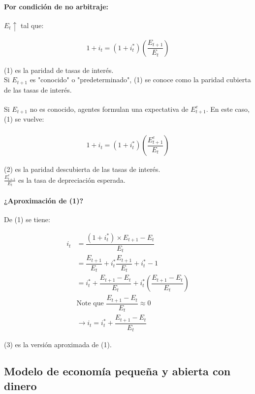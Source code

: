 \documentclass[8pt]{article}
\begin{document}
\paragraph*{Por condición de no arbitraje:} $E_{t} \uparrow$ tal que: 

\begin{align}
    \label{eq:1}
    1+i_{t} = (1+i_{t}^*)\left(\dfrac{E_{t+1}}{E_{t}}\right)
\end{align}

(1) es la paridad de tasas de interés. \\
    Si $E_{t+1}$ es "conocido" o "predeterminado", (1) se conoce como la paridad cubierta de las tasas de interés. \\\\
    Si $E_{t+1}$ no es conocido, agentes formulan una expectativa de $E_{t+1}^e$. En este caso, (1) se vuelve: \\\\
    \begin{align}
        1+i_{t} = (1+i_{t}^*)\left(\dfrac{E_{t+1}^e}{E_{t}}\right)
    \end{align}

(2) es la paridad descubierta de las tasas de interés. \\

    $\frac{E_{t+1}^e}{E_{t}}$ es la tasa de depreciación esperada.

\paragraph*{¿Aproximación de (1)?}

De (1) se tiene:

\begin{align}
    i_t &= \dfrac{(1+i_t^*) \times E_{t+1} - E_{t}}{E_{t}} \nonumber\\
        &= \dfrac{E_{t+1}}{E_t} + i_t^*\dfrac{E_{t+1}}{E_{t}} + i_t^* - 1 \nonumber\\
        &= i_t^* + \dfrac{E_{t+1}-E_t}{E_{t}} + i_t^*\left(\dfrac{E_{t+1}-E_t}{E_{t}}\right) \nonumber\\
        &\text{Note que } \dfrac{E_{t+1}-E_t}{E_{t}} \approx 0 \nonumber\\
        &\rightarrow i_t = i_t^* + \dfrac{E_{t+1}-E_t}{E_{t}}
\end{align}

(3) es la versión aproximada de (1).

\subsection{Modelo de economía pequeña y abierta con dinero}
\setcounter{align}{0}
\end{document}
